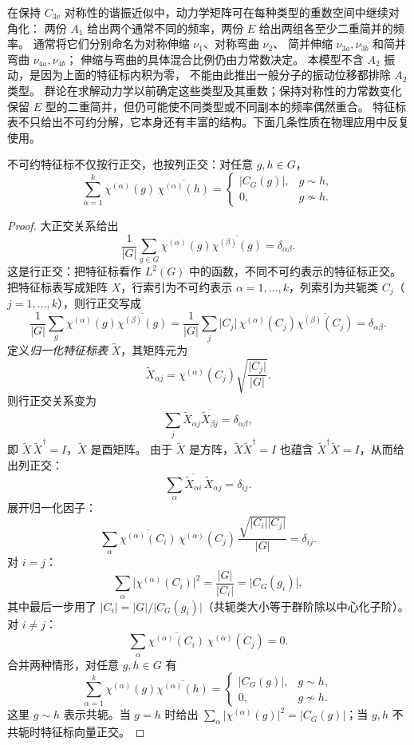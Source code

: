 在保持 $C_{3v}$ 对称性的谐振近似中，动力学矩阵可在每种类型的重数空间中继续对角化：
两份 $A_1$ 给出两个通常不同的频率，两份 $E$ 给出两组各至少二重简并的频率。
通常将它们分别命名为对称伸缩 $\nu_1$、对称弯曲 $\nu_2$、
简并伸缩 $\nu_{3a},\nu_{3b}$ 和简并弯曲 $\nu_{4a},\nu_{4b}$；
伸缩与弯曲的具体混合比例仍由力常数决定。
本模型不含 $A_2$ 振动，是因为上面的特征标内积为零，
不能由此推出一般分子的振动位移都排除 $A_2$ 类型。
群论在求解动力学以前确定这些类型及其重数；保持对称性的力常数变化
保留 $E$ 型的二重简并，但仍可能使不同类型或不同副本的频率偶然重合。
特征标表不只给出不可约分解，它本身还有丰富的结构。下面几条性质在物理应用中反复使用。
\begin{theorem}[特征标的列正交关系]\label{thm:character-column-orthogonality}
不可约特征标不仅按行正交，也按列正交：对任意 $g,h\in G$，
\[
\sum_{\alpha=1}^{k}\chi^{(\alpha)}(g)\,\overline{\chi^{(\alpha)}(h)}
=\begin{cases}
\lvert C_G(g)\rvert, & g\sim h,\\
0, & g\not\sim h.
\end{cases}
\]
\end{theorem}
\begin{proof}
大正交关系给出
\[
\frac1{\lvert G\rvert}\sum_{g\in G}\chi^{(\alpha)}(g)\overline{\chi^{(\beta)}(g)}=\delta_{\alpha\beta}.
\]
这是行正交：把特征标看作 $L^2(G)$ 中的函数，不同不可约表示的特征标正交。
把特征标表写成矩阵 $X$，行索引为不可约表示 $\alpha=1,\dots,k$，列索引为共轭类 $C_j$（$j=1,\dots,k$），则行正交写成
\[
\frac1{\lvert G\rvert}\sum_{g}\chi^{(\alpha)}(g)\overline{\chi^{(\beta)}(g)}
=\frac1{\lvert G\rvert}\sum_j\lvert C_j\rvert\,\chi^{(\alpha)}(C_j)\overline{\chi^{(\beta)}(C_j)}
=\delta_{\alpha\beta}.
\]
定义\emph{归一化特征标表} $\tilde X$，其矩阵元为
\[
\tilde X_{\alpha j}=\chi^{(\alpha)}(C_j)\sqrt{\frac{\lvert C_j\rvert}{\lvert G\rvert}}.
\]
则行正交关系变为
\[
\sum_j\tilde X_{\alpha j}\overline{\tilde X_{\beta j}}=\delta_{\alpha\beta},
\]
即 $\tilde X\,\tilde X^\dagger=I$，$\tilde X$ 是酉矩阵。
由于 $\tilde X$ 是方阵，$\tilde X\tilde X^\dagger=I$ 也蕴含 $\tilde X^\dagger\tilde X=I$，从而给出列正交：
\[
\sum_\alpha\overline{\tilde X_{\alpha i}}\,\tilde X_{\alpha j}=\delta_{ij}.
\]
展开归一化因子：
\[
\sum_\alpha\overline{\chi^{(\alpha)}(C_i)}\,\chi^{(\alpha)}(C_j)\,\frac{\sqrt{\lvert C_i\rvert\lvert C_j\rvert}}{\lvert G\rvert}=\delta_{ij}.
\]
对 $i=j$：
\[
\sum_\alpha\lvert\chi^{(\alpha)}(C_i)\rvert^2=\frac{\lvert G\rvert}{\lvert C_i\rvert}=\lvert C_G(g_i)\rvert,
\]
其中最后一步用了 $\lvert C_i\rvert=\lvert G\rvert/\lvert C_G(g_i)\rvert$（共轭类大小等于群阶除以中心化子阶）。
对 $i\neq j$：
\[
\sum_\alpha\overline{\chi^{(\alpha)}(C_i)}\,\chi^{(\alpha)}(C_j)=0.
\]
合并两种情形，对任意 $g,h\in G$ 有
\[
\sum_{\alpha=1}^{k}\chi^{(\alpha)}(g)\overline{\chi^{(\alpha)}(h)}
=\begin{cases}\lvert C_G(g)\rvert,&g\sim h,\\0,&g\not\sim h.\end{cases}
\]
这里 $g\sim h$ 表示共轭。当 $g=h$ 时给出 $\sum_\alpha\lvert\chi^{(\alpha)}(g)\rvert^2=\lvert C_G(g)\rvert$；当 $g,h$ 不共轭时特征标向量正交。
\end{proof}
